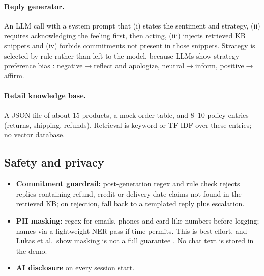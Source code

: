 \documentclass[11pt,a4paper]{article}
\begin{document}
\paragraph{Reply generator.} An LLM call with a system prompt that (i) states the sentiment and strategy, (ii) requires acknowledging the feeling first, then acting, (iii) injects retrieved KB snippets and (iv) forbids commitments not present in those snippets. Strategy is selected by rule rather than left to the model, because LLMs show strategy preference bias \cite{kang2024}: negative$\to$reflect and apologize, neutral$\to$inform, positive$\to$affirm.

\paragraph{Retail knowledge base.} A JSON file of about 15 products, a mock order table, and 8--10 policy entries (returns, shipping, refunds). Retrieval is keyword or TF-IDF over these entries; no vector database.

\subsection{Safety and privacy}\label{sec:safety}
\begin{itemize}
\item \textbf{Commitment guardrail:} post-generation regex and rule check rejects replies containing refund, credit or delivery-date claims not found in the retrieved KB; on rejection, fall back to a templated reply plus escalation.
\item \textbf{PII masking:} regex for emails, phones and card-like numbers before logging; names via a lightweight NER pass if time permits. This is best effort, and Lukas et al.\ show masking is not a full guarantee \cite{lukas2023}. No chat text is stored in the demo.
\item \textbf{AI disclosure} on every session start.
\end{itemize}

\end{document}
